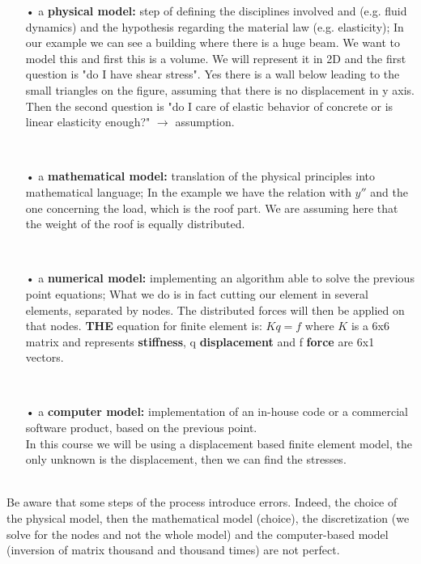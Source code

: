 		\begin{itemize}
				\item[•] a \textbf{physical model:} step of defining the disciplines involved and (e.g. fluid dynamics) and the hypothesis regarding the material law (e.g. elasticity); In our example we can see a building where there is a huge beam. We want to model this and first this is a volume. We will represent it in 2D and the first question is "do I have shear stress". Yes there is a wall below leading to the small triangles on the figure, assuming that there is no displacement in y axis. Then the second question is "do I care of elastic behavior of concrete or is linear elasticity enough?" $\rightarrow$ assumption. 
				
			\ 	\item[•] a \textbf{mathematical model:} translation of the physical principles into mathematical language; In the example we have the relation with $y''$ and the one concerning the load, which is the roof part. We are assuming here that the weight of the roof is equally distributed. 
				\end{itemize}
				\ \\
				\begin{itemize}
				\item[•] a \textbf{numerical model:} implementing an algorithm able to solve the previous point equations; 
				What we do is in fact cutting our element in several elements, separated by nodes. The distributed forces will then be applied on that nodes. \textbf{THE} equation for finite element is: $Kq = f$ where $K$ is a 6x6 matrix and represents \textbf{stiffness}, q \textbf{displacement} and f \textbf{force} are 6x1 vectors. 
				
			\	\item[•] a \textbf{computer model:} implementation of an in-house code or a commercial software product, based on the previous point. \\
				In this course we will be using a displacement based finite element model, the only unknown is the displacement, then we can find the stresses. 
			\end{itemize}
			
			\ \\ Be aware that some steps of the process introduce errors. Indeed, the choice of the physical model, then the mathematical model (choice), the discretization (we solve for the nodes and not the whole model) and the computer-based model (inversion of matrix thousand and thousand times) are not perfect.